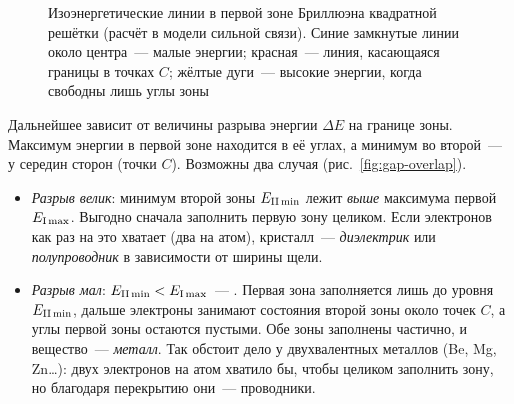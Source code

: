 \begin{figure}[ht]
\centering
{}
\caption{Изоэнергетические линии в первой зоне Бриллюэна квадратной
решётки (расчёт в модели сильной связи). Синие замкнутые линии около
центра~— малые энергии; красная~— линия, касающаяся границы в точках
$C$; жёлтые дуги~— высокие энергии, когда свободны лишь углы зоны}
\label{fig:contours}
\end{figure}

Дальнейшее зависит от величины разрыва энергии $\Delta E$ на границе
зоны. Максимум энергии в первой зоне находится в её углах, а минимум во
второй~— у середин сторон (точки $C$). Возможны два случая
(рис.~\ref{fig:gap-overlap}).
\begin{itemize}
\item \emph{Разрыв велик}: минимум второй зоны $E_\text{II\,min}$ лежит
\emph{выше} максимума первой $E_\text{I\,max}$. Выгодно сначала
заполнить первую зону целиком. Если электронов как раз на это хватает
(два на атом), кристалл~— \emph{диэлектрик} или \emph{полупроводник} в
зависимости от ширины щели.
\item \emph{Разрыв мал}: $E_\text{II\,min}<E_\text{I\,max}$~—
. Первая зона заполняется лишь до уровня
$E_\text{II\,min}$, дальше электроны занимают состояния второй зоны
около точек $C$, а углы первой зоны остаются пустыми. Обе зоны заполнены
частично, и вещество~— \emph{металл}. Так обстоит дело у двухвалентных
металлов (Be, Mg, Zn\ldots): двух электронов на атом хватило бы, чтобы
целиком заполнить зону, но благодаря перекрытию они~— проводники.
\end{itemize}

